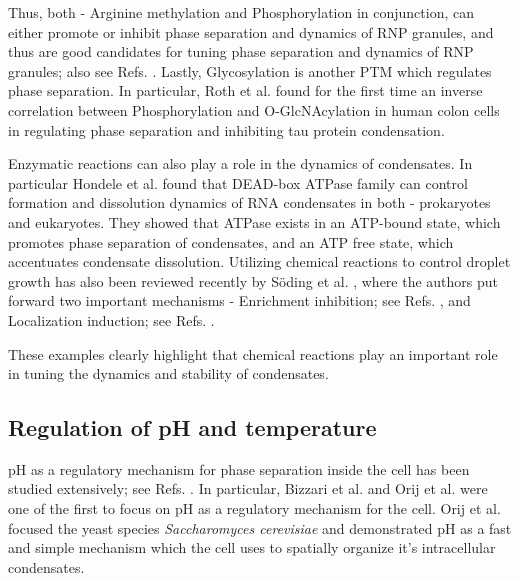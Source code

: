 Thus, both - Arginine methylation and Phosphorylation in conjunction, can either promote or inhibit phase separation and dynamics of RNP granules, and thus are good candidates for tuning phase separation and dynamics of RNP granules; also see Refs. \cite{Schisa2021,VelazquezCruz2021}.
Lastly, Glycosylation is another PTM which regulates phase separation. 
In particular, Roth et al. \cite{Roth2017} found for the first time an inverse correlation between Phosphorylation and O-GlcNAcylation in human colon cells in regulating phase separation and inhibiting tau protein condensation. 

Enzymatic reactions can also play a role in the dynamics of condensates. 
In particular Hondele et al. \cite{Hondele2019} found that DEAD-box ATPase family can control formation and dissolution dynamics of RNA condensates in both - prokaryotes and eukaryotes.
They showed that ATPase exists in an ATP-bound state, which promotes phase separation of condensates, and an ATP free state, which accentuates condensate dissolution. 
Utilizing chemical reactions to control droplet growth has also been reviewed recently by S\"{o}ding et al. \cite{SODING20204}, where the authors put forward two important mechanisms - Enrichment inhibition; see Refs. \cite{Wang2014,Kirschbaum2021}, and Localization induction; see Refs. \cite{Langelier2012,Kirschbaum2021}.

These examples clearly highlight that chemical reactions play an important role in tuning the dynamics and stability of condensates. 

\subsection{Regulation of pH and temperature}

pH as a regulatory mechanism for phase separation inside the cell has been studied extensively; see Refs. \cite{Orij2011,Kroschwald2018,Peters2013,Petrovska2014}.
In particular, Bizzari et al. \cite{Bizzarri2008} and Orij et al. \cite{Orij2011} were one of the first to focus on pH as a regulatory mechanism for the cell. 
Orij et al. \cite{Orij2011} focused the yeast species \textit{Saccharomyces cerevisiae} and demonstrated pH as a fast and simple mechanism which the cell uses to spatially organize it's intracellular condensates.

